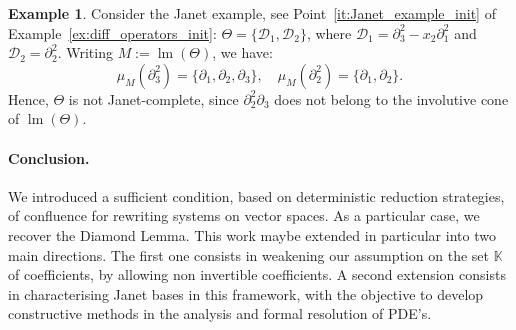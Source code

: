 \documentclass[10pt]{easychair}
\theoremstyle{definition}
\newtheorem{example}[theorem]{Example}
\newcommand\D{\mathcal{D}}
\DeclareMathOperator{\lm}{lm}
\newcommand\K{\mathbb{K}}
\begin{document}
 
\begin{example}
  Consider the Janet example, see Point~\ref{it:Janet_example_init} of
  Example~\ref{ex:diff_operators_init}: $\Theta=\{\D_1,\D_2\}$, where
  $\D_1=\partial_3^2 -x_2\partial_1^2$ and $\D_2=\partial_2^2$. Writing
  $M:=\lm(\Theta)$, we have:
  \[\mu_M(\partial_3^2)=\{\partial_1,\partial_2,\partial_3\},\quad
  \mu_M(\partial_2^2)=\{\partial_1,\partial_2\}.\]
  Hence, $\Theta$ is not Janet-complete, since $\partial_2^2\partial_3$
  does not belong to the involutive cone of $\lm(\Theta)$.
 \end{example}




 \paragraph{Conclusion.} We introduced a sufficient condition,
 based on deterministic reduction strategies, of confluence for
 rewriting systems on vector spaces. As a particular case,
 we recover the Diamond Lemma. This work maybe extended in particular
 into two main directions. The first one consists in weakening our assumption
 on the set $\K$ of coefficients, by allowing non invertible coefficients.
 A second extension consists in characterising Janet bases in this framework,
 with the objective to develop constructive methods in the analysis and formal
 resolution of PDE's.


\end{document}
